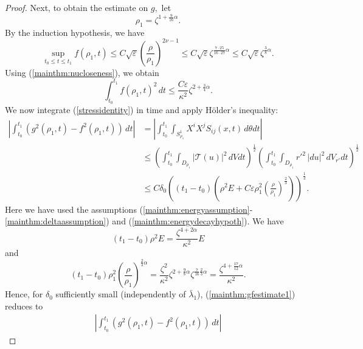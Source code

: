 \documentclass[12pt]{amsart}
\newcommand{\T}{{\mathcal T}}
\theoremstyle{others}
\numberwithin{equation}{section}
\newcommand{\eps}{\varepsilon}
\begin{document}
\begin{proof}
Next, to obtain the estimate on $g,$ let
$$\rho_1 = \zeta^{1 + \frac{9}{16} \alpha}.$$
By the induction hypothesis, we have
\begin{equation*}
\sup_{t_0 \leq t \leq t_1} f(\rho_1, t) \leq C \sqrt{\eps} \left(\frac{\rho }{\rho_1 } \right)^{2\nu - 1} \leq C \sqrt{\eps}  \zeta^{\frac{7\cdot 25}{16 \cdot 27}\alpha } \leq C \sqrt{\eps} \zeta^{\frac{3}{8} \alpha}.
\end{equation*}
Using (\ref{mainthm:nucloseness}), we obtain
\begin{equation}\label{mainthm:ftimeest}
\int_{t_0}^{t_1} f(\rho_1, t)^2 \, dt %
\leq \frac{C \eps }{\kappa^2} \zeta^{2 + \frac{3}{4}\alpha }.
\end{equation}
We now integrate (\ref{stressidentity}) in time and apply H\"older's inequality:
\begin{equation}\label{mainthm:gfestimate1}
\begin{split}
\left| \int_{t_0}^{t_1} \left( g^2(\rho_1, t) - f^2(\rho_1, t) \right) \, dt \right| %
& = \left| \int_{t_0}^{t_1} \!\!\!\!\! \int_{S^1_{\rho_1}} X^i X^j S_{ij} (x,t) \, d\theta dt \right| \\
& \leq \left( \int_{t_0}^{t_1} \!\!\!\!\! \int_{D_{\rho_1}} |\T(u)|^2 \, dV dt  \right)^{\frac12} \left( \int_{t_0}^{t_1} \!\!\!\!\!  \int_{D_{\rho_1}} r'^2 \, |du|^2 \, dV_{r'} dt \right)^{\frac12} \\
& \leq C \delta_0 \left( (t_1 - t_0) \left( \rho^2 E + C \eps \rho_1^2 \left( \frac{\rho}{\rho_1} \right)^{\frac{2}{3} } \right) \right)^{\frac12}.
\end{split}
\end{equation}
Here we have used the assumptions (\ref{mainthm:energyassumption}-\ref{mainthm:deltaassumption}) and (\ref{mainthm:energydecayhypoth}).
We have
$$(t_1 - t_0) \rho^2 E = \frac{\zeta^{4 + 2 \alpha}}{\kappa^2} E$$
and 
$$(t_1 - t_0) \rho_1^2 \left( \frac{\rho}{\rho_1} \right)^{\frac{2}{3} \alpha} = \frac{\zeta^2}{\kappa^2} \zeta^{2 + \frac98 \alpha} \zeta^{\frac{7}{16} \frac23 \alpha} = \frac{ \zeta^{4 + \frac{17}{12} \alpha} }{\kappa^2}.$$
Hence, for $\delta_0$ sufficiently small (independently of $\bar{\lambda}_1$), (\ref{mainthm:gfestimate1}) reduces to
\begin{equation*}
\begin{split}
\left| \int_{t_0}^{t_1} \left( g^2(\rho_1, t) - f^2(\rho_1, t) \right) \, dt \right| %

\end{split}
\end{equation*}
\end{proof}
\end{document}
